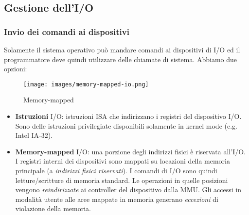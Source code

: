 \subsection{Gestione dell'I/O}
\subsubsection{Invio dei comandi ai dispositivi}
Solamente il sistema operativo può mandare comandi ai dispositivi di I/O ed il programmatore deve quindi utilizzare delle chiamate di sistema. Abbiamo due opzioni:
\begin{wrapfigure}{r}{5cm}
	\vspace{20px}
	\centering
	\texttt{[image: images/memory-mapped-io.png]}
	\caption{Memory-mapped}
\end{wrapfigure}
\begin{itemize}
    \item \textbf{Istruzioni} I/O: istruzioni ISA che indirizzano i registri del dispositivo I/O. Sono delle istruzioni privilegiate disponibili solamente in kernel mode (e.g. Intel IA-32).
    \item \textbf{Memory-mapped} I/O: una porzione degli indirizzi fisici è riservata all'I/O. I registri interni dei dispositivi sono mappati su locazioni della memoria principale (a \emph{indirizzi fisici riservati}). I comandi di I/O sono quindi letture/scritture di memoria standard. Le operazioni in quelle posizioni vengono \emph{reindirizzate} ai controller del dispositivo dalla MMU. Gli accessi in modalità utente alle aree mappate in memoria generano \emph{eccezioni} di violazione della memoria.
\end{itemize}

